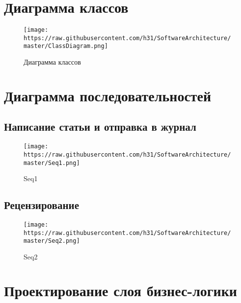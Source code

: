 \section{Диаграмма
классов}\label{ux434ux438ux430ux433ux440ux430ux43cux43cux430-ux43aux43bux430ux441ux441ux43eux432}

\begin{figure}[htbp]
\centering
\texttt{[image: https://raw.githubusercontent.com/h31/SoftwareArchitecture/master/ClassDiagram.png]}
\caption{Диаграмма классов}
\end{figure}

\section{Диаграмма
последовательностей}\label{ux434ux438ux430ux433ux440ux430ux43cux43cux430-ux43fux43eux441ux43bux435ux434ux43eux432ux430ux442ux435ux43bux44cux43dux43eux441ux442ux435ux439}

\subsection{Написание статьи и отправка в
журнал}\label{ux43dux430ux43fux438ux441ux430ux43dux438ux435-ux441ux442ux430ux442ux44cux438-ux438-ux43eux442ux43fux440ux430ux432ux43aux430-ux432-ux436ux443ux440ux43dux430ux43b}

\begin{figure}[htbp]
\centering
\texttt{[image: https://raw.githubusercontent.com/h31/SoftwareArchitecture/master/Seq1.png]}
\caption{Seq1}
\end{figure}

\subsection{Рецензирование}\label{ux440ux435ux446ux435ux43dux437ux438ux440ux43eux432ux430ux43dux438ux435-1}

\begin{figure}[htbp]
\centering
\texttt{[image: https://raw.githubusercontent.com/h31/SoftwareArchitecture/master/Seq2.png]}
\caption{Seq2}
\end{figure}

\section{Проектирование слоя
бизнес-логики}\label{ux43fux440ux43eux435ux43aux442ux438ux440ux43eux432ux430ux43dux438ux435-ux441ux43bux43eux44f-ux431ux438ux437ux43dux435ux441-ux43bux43eux433ux438ux43aux438}

